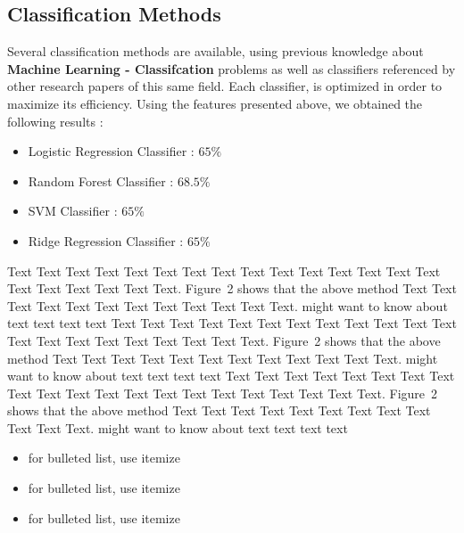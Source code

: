 \documentclass{bioinfo}
\begin{document}
\begin{methods}
\section{Classification Methods}

Several classification methods are available, using previous knowledge about \textbf{Machine Learning - Classifcation} problems as well as classifiers referenced by other research papers of this same field. Each classifier, is optimized in order to maximize its efficiency. Using the features presented above, we obtained the following results :

\begin{itemize}
	\item Logistic Regression Classifier : $65\%$
	\item Random Forest Classifier : $68.5\%$
	\item SVM Classifier : $65\%$
	\item Ridge Regression Classifier : $65\%$
\end{itemize}





Text Text Text Text Text Text  Text Text Text Text Text Text Text
Text Text  Text Text Text Text Text Text.
Figure~2\vphantom{\ref{fig:02}} shows that the above method  Text
Text Text Text  Text Text Text Text Text Text  Text Text.
\citealp{Boffelli03} might want to know about  text text text text
Text Text Text Text Text Text Text Text Text Text Text Text Text
Text Text  Text Text Text Text Text Text.
Figure~2\vphantom{\ref{fig:02}} shows that the above method  Text
Text Text Text Text Text Text Text Text Text  Text Text.
\citealp{Boffelli03} might want to know about text text text text
Text Text Text Text Text Text  Text Text Text Text Text Text Text
Text Text Text Text Text Text Text Text.
Figure~2\vphantom{\ref{fig:02}} shows that the above method  Text
Text Text Text Text Text Text Text Text Text  Text Text.
\citealp{Boffelli03} might want to know about text text text
text\vspace*{1pt}

\begin{itemize}
\item for bulleted list, use itemize
\item for bulleted list, use itemize
\item for bulleted list, use itemize\vspace*{1pt}
\end{itemize}


\end{methods}
\end{document}
